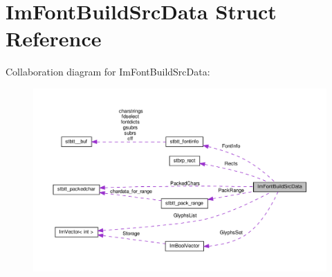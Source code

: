 \hypertarget{structImFontBuildSrcData}{}\section{Im\+Font\+Build\+Src\+Data Struct Reference}
\label{structImFontBuildSrcData}


Collaboration diagram for Im\+Font\+Build\+Src\+Data\+:\nopagebreak
\begin{figure}[H]
\begin{center}
\leavevmode
\includegraphics[width=350pt]{structImFontBuildSrcData__coll__graph}
\end{center}
\end{figure}
